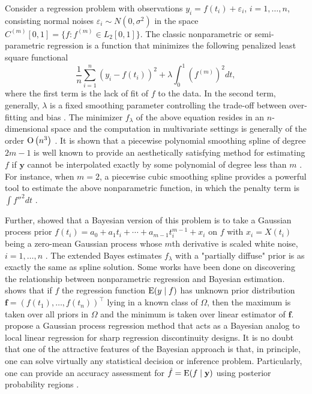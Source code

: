 Consider a regression problem with observations $y_i = f(t_i)+\varepsilon_i$, $i=1,\ldots,n$, consisting \iid normal noises $\varepsilon_i\sim N(0,\sigma^2)$ in the space $C^{(m)}[0,1]=\{ f:f^{(m)}\in \mathit{L}_2[0,1] \}$. The classic nonparametric or semi-parametric regression is a function that minimizes the following penalized least square functional 
\begin{equation}\label{GaussianProcessGeneralObjective}
\frac{1}{n}\sum_{i=1}^{n}\left( y_i-f(t_i) \right)^2 + \lambda \int_{0}^{1} \left( f^{(m)}\right)^2dt, 
\end{equation}
where the first term is the lack of fit of $f$ to the data. In the second term, generally, $\lambda$ is a fixed smoothing parameter controlling the trade-off between over-fitting and bias \cite{esl2009}. The minimizer $f_\lambda$ of the above equation resides in an $n$-dimensional space and the computation in multivariate settings is generally of the order ${\rm O}\left(n^3\right)$ \cite{kim2004smoothing}. It is shown that a piecewise polynomial smoothing spline of degree $2m-1$ is well known to provide an aesthetically satisfying method for estimating $f$ if $\mathbf{y}$ cannot be interpolated exactly by some polynomial of degree less than $m$ \cite{schoenberg1964spline}. For instance, when $m=2$, a piecewise cubic smoothing spline provides a powerful tool to estimate the above nonparametric function, in which the penalty term is $\int f''^2dt$ \cite{hastie1990generalized}. 


Further, \cite{wahba1978improper} showed that a Bayesian version of this problem is to take a Gaussian process prior $f(t_i) = a_0+a_1t_i+\cdots + a_{m-1}t_i^{m-1} + x_i$ on $f$ with $x_i=X(t_i)$ being a zero-mean Gaussian process whose $m$th derivative is scaled white noise, $i=1,\ldots,n$ \cite{speckman2003fully}. The extended Bayes estimates $f_\lambda$ with a "partially diffuse" prior is as exactly the same as spline solution. Some works have been done on discovering the relationship between nonparametric regression and Bayesian estimation. \cite{heckman1991minimax} shows that if $f$ the regression function $\mathrm{E}(y\mid f)$ has unknown prior distribution  $\mathbf{f}=(f(t_1),\ldots,f(t_n))^\top$ lying in a known class of $\Omega$, then the maximum is taken over all priors in $\Omega$ and the minimum is taken over linear estimator of $\mathbf{f}$. \cite{branson2017nonparametric} propose a Gaussian process regression method that acts as a Bayesian analog to local linear regression for sharp regression discontinuity designs. It is no doubt that one of the attractive features of the Bayesian approach is that, in principle, one can solve virtually any statistical decision or inference problem. Particularly, one can provide an accuracy assessment for $\hat{f}=\mathrm{E} (f\mid \mathbf{y})$ using posterior probability regions \cite{cox1993analysis}. 



